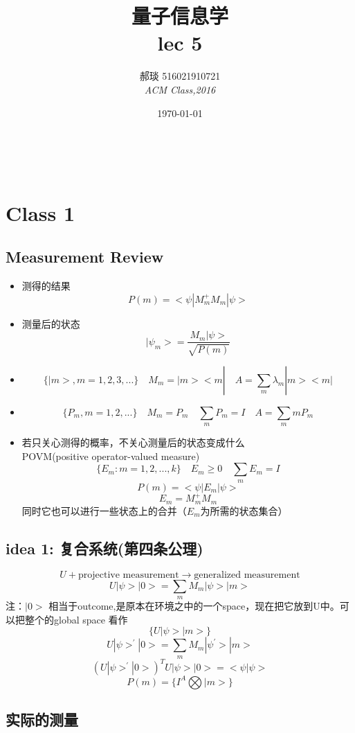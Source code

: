 \documentclass[a4paper, 11pt]{article} %
\title{\textbf{量子信息学}\\ %
lec 5} %
\author{\textsc{郝琰 516021910721} %
\\{\textit{ACM Class,2016}}} %
\date{\today} %
\makeatletter
\renewcommand{\maketitle}{ %

\begin{flushright} %
{\LARGE\@title} %

\vspace{50pt} %

{\large\@author} %
\\\@date %

\vspace{10pt} %
\end{flushright}
}
\makeatother
\begin{document}
\maketitle
\section{Class 1}
\subsection{Measurement Review}
\begin{itemize}
\item
测得的结果
$$
P(m) = <\psi|M_m^+M_m|\psi>
$$
\item
测量后的状态
$$
|\psi_m> = \frac{M_m|\psi>}{\sqrt{P(m)}}
$$
\item
$$
\lbrace |m>,m = 1,2,3,...\rbrace\quad M_m = |m><m| \quad A = \sum_m \lambda_m|m><m|
$$
\item
$$
\lbrace P_m, m = 1,2,...\rbrace \quad M_m = P_m \quad \sum_mP_m = I \quad A = \sum_m mP_m
$$
\item
若只关心测得的概率，不关心测量后的状态变成什么\\
POVM(positive operator-valued measure)
$$
\lbrace E_m: m = 1,2,...,k \rbrace \quad E_m \geq 0 \quad \sum_m E_m = I
$$
$$
P(m) = <\psi|E_m|\psi>
$$
$$
E_m = M_m^+M_m
$$
同时它也可以进行一些状态上的合并（$E_m$为所需的状态集合）
\end{itemize}

\subsection{idea 1: 复合系统(第四条公理)}
$$
U + \mbox{projective measurement} \rightarrow \mbox{generalized measurement}
$$
$$
U|\psi>|0> = \sum_mM_m|\psi>|m>
$$
注：$|0>$ 相当于outcome,是原本在环境之中的一个space，现在把它放到U中。可以把整个的global space 看作
$$
\lbrace U|\psi>|m> \rbrace
$$
$$
U|\psi>^{'}|0> = \sum_mM_m|\psi^{'}>|m>
$$
$$
(U|\psi>^{'}|0>)^TU|\psi>|0>  = <\psi|\psi>
$$
$$
P(m) = \lbrace I^A \bigotimes |m> \rbrace
$$


\subsection{实际的测量}
\end{document}
